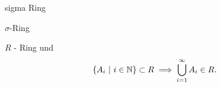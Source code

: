 \documentclass[class=article, crop=false]{standalone}
\begin{document}
\begin{zettel}{sigma Ring}

\begin{flashcard}[ypem3c3h]{$\sigma$-Ring}
	\begin{definition}
		$R$ - Ring und
		\[
			\set{A_i}{i \in \N} \subset R \implies  \bigcup_{i = 1 }^{\infty} A_i \in  R
		.\]
	\end{definition}
\end{flashcard}
\end{zettel}
\end{document}
